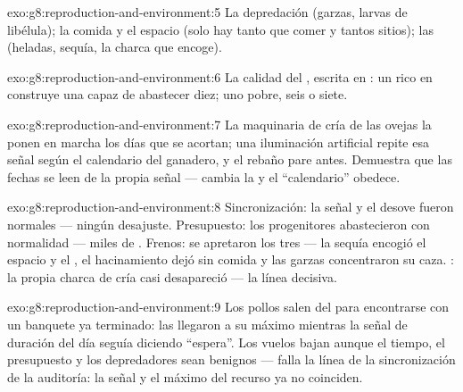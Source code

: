 \begin{solution}{exo:g8:reproduction-and-environment:5}
La depredación (garzas, larvas de libélula); la comida y el espacio
(solo hay tanto que comer y tantos sitios); las  (heladas,
sequía, la charca que encoge).
\end{solution}

\begin{solution}{exo:g8:reproduction-and-environment:6}
La calidad del , escrita en : un  rico en 
construye una  capaz de abastecer diez; uno pobre, seis o siete.
\end{solution}

\begin{solution}{exo:g8:reproduction-and-environment:7}
La maquinaria de cría de las ovejas la ponen en marcha los días que se
acortan; una iluminación artificial repite esa señal según el
calendario del ganadero, y el rebaño pare antes. Demuestra que las
fechas se leen de la propia señal --- cambia la  y el ``calendario''
obedece.
\end{solution}

\begin{solution}{exo:g8:reproduction-and-environment:8}
Sincronización: la señal y el desove fueron normales --- ningún
desajuste. Presupuesto: los progenitores abastecieron con normalidad
--- miles de . Frenos: se apretaron los tres --- la sequía
encogió el espacio y el , el hacinamiento dejó sin comida y las
garzas concentraron su caza. : la propia charca de cría casi
desapareció --- la línea decisiva.
\end{solution}

\begin{solution}{exo:g8:reproduction-and-environment:9}
Los pollos salen del  para encontrarse con un banquete ya
terminado: las  llegaron a su máximo mientras la señal de
duración del día seguía diciendo ``espera''. Los vuelos bajan aunque el
tiempo, el presupuesto y los depredadores sean benignos --- falla la
línea de la sincronización de la auditoría: la señal y el máximo del
recurso ya no coinciden.
\end{solution}

